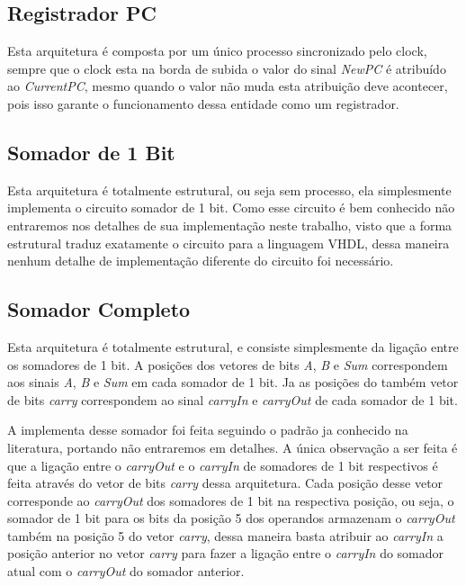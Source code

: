 \documentclass[12pt]{article}
\begin{document}
\subsection{Registrador PC}

Esta arquitetura é composta por um único processo sincronizado pelo clock, sempre que o clock esta na borda de subida o valor do sinal \textit{NewPC} é atribuído ao \textit{CurrentPC}, mesmo quando o valor não muda esta atribuição deve acontecer, pois isso garante o funcionamento dessa entidade como um registrador.

\subsection{Somador de 1 Bit}

Esta arquitetura é totalmente estrutural, ou seja sem processo, ela simplesmente implementa o circuito somador de 1 bit. Como esse circuito é bem conhecido não entraremos nos detalhes de sua implementação neste trabalho, visto que a forma estrutural traduz exatamente o circuito para a linguagem VHDL, dessa maneira nenhum detalhe de implementação diferente do circuito foi necessário.

\subsection{Somador Completo}

Esta arquitetura é totalmente estrutural, e consiste simplesmente da ligação entre os somadores de 1 bit. A posições dos vetores de bits \textit{A}, \textit{B} e \textit{Sum} correspondem aos sinais \textit{A}, \textit{B} e \textit{Sum} em cada somador de 1 bit. Ja as posições do também vetor de bits \textit{carry} correspondem ao sinal \textit{carryIn} e \textit{carryOut} de cada somador de 1 bit.

A implementa desse somador foi feita seguindo o padrão ja conhecido na literatura, portando não entraremos em detalhes. A única observação a ser feita é que a ligação entre o \textit{carryOut} e o \textit{carryIn} de somadores de 1 bit respectivos é feita através do vetor de bits \textit{carry} dessa arquitetura. Cada posição desse vetor corresponde ao \textit{carryOut} dos somadores de 1 bit na respectiva posição, ou seja, o somador de 1 bit para os bits da posição 5 dos operandos armazenam o \textit{carryOut} também na posição 5 do vetor \textit{carry}, dessa maneira basta atribuir ao \textit{carryIn} a posição anterior no vetor \textit{carry} para fazer a ligação entre o \textit{carryIn} do somador atual com o \textit{carryOut} do somador anterior.
\end{document}
